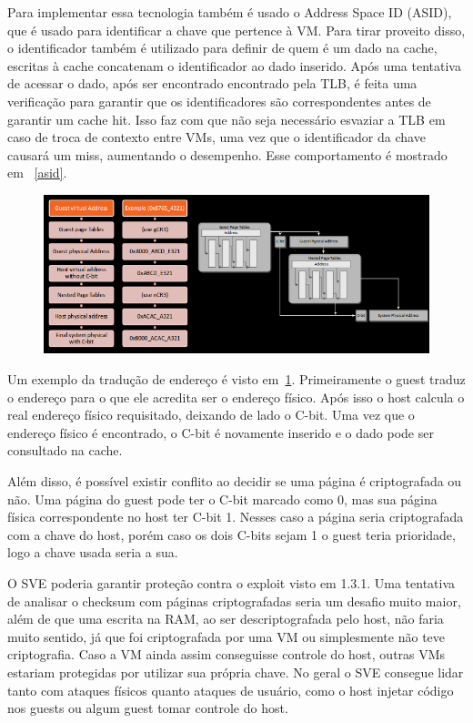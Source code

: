 \documentclass{report}
\begin{document}
Para implementar essa tecnologia também é usado o Address Space ID (ASID), que
é usado para identificar a chave que pertence à VM. Para tirar proveito disso, o identificador
também é utilizado para definir de quem é um dado na cache, escritas à cache
concatenam o identificador ao dado inserido. Após uma tentativa de acessar o dado, após ser encontrado
encontrado pela TLB, é feita uma verificação para garantir que os
identificadores são correspondentes antes de garantir um cache hit. Isso faz
com que não seja necessário esvaziar a TLB em caso de troca de contexto entre
VMs, uma vez que o identificador da chave causará um miss, aumentando
o desempenho. Esse comportamento é mostrado em ~\ref{asid}.

\begin{figure}[h]
    \centering
    \includegraphics[width=1\textwidth]{img/sev-address-translation}
    \label{sev-address-translation}
\end{figure}

Um exemplo da tradução de endereço é visto em~\ref{sev-address-translation}.
Primeiramente o guest traduz o endereço para o que ele acredita ser o endereço
físico. Após isso o host calcula o real endereço físico requisitado, deixando
de lado o C-bit. Uma vez que o endereço físico é encontrado, o C-bit é
novamente inserido e o dado pode ser consultado na cache.

Além disso, é possível existir conflito ao decidir se uma página é criptografada
ou não. Uma página do guest pode ter o C-bit marcado como 0, mas sua página
física correspondente no host ter C-bit 1. Nesses caso a página seria
criptografada com a chave do host, porém caso os dois C-bits sejam 1 o guest
teria prioridade, logo a chave usada seria a sua.

O SVE poderia garantir proteção contra o exploit visto em 1.3.1. Uma
tentativa de analisar o checksum com páginas criptografadas seria um desafio
muito maior, além de que uma escrita na RAM, ao ser descriptografada pelo host,
não faria muito sentido, já que foi criptografada por uma VM ou simplesmente
não teve criptografia. Caso a VM ainda assim conseguisse controle do host,
outras VMs estariam protegidas por utilizar sua própria chave. No geral o SVE
consegue lidar tanto com ataques físicos quanto ataques de usuário, como o host
injetar código nos guests ou algum guest tomar controle do host.
\end{document}
